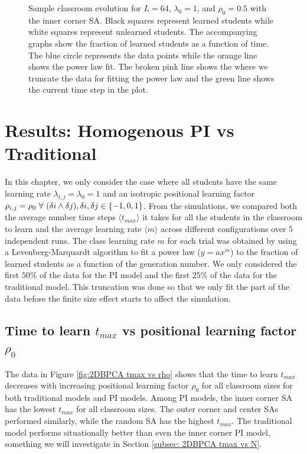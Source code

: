 \begin{figure}[htbp!]
    \caption{Sample classroom evolution for $L=64$, $\lambda_0 = 1$, and $\rho_0 = 0.5$ with the inner corner SA. 
    Black squares represent learned students while white squares represent unlearned students. 
    The accompanying graphs show the fraction of learned students as a function of time. 
    The blue circle represents the data points while the orange line shows the power law fit. 
    The broken pink line shows the where we truncate the data for fitting the power law and the green line shows the current time step in the plot.}
    \label{fig:Sample classroom evolution}
 \end{figure}

\section{Results: Homogenous PI vs Traditional}
In this chapter, we only consider the case where all students have the same learning rate $\lambda_{i,j} = \lambda_0 = 1$ and an isotropic positional learning factor $\rho_{i,j} = \rho_0 \space ~\forall~ (\delta i \land \delta j),  \delta i, \delta j \in \lbrace -1,0,1 \rbrace $. 
From the simulations, we compared both the average number time steps $\langle t_{max} \rangle$ it takes for all the students in the classroom to learn and the average learning rate $\langle m \rangle$ across different configurations over 5 independent runs.
 The class learning rate $m$ for each trial was obtained by using a Levenberg-Marquardt algorithm to fit a power law ($y = ax^m$) to the fraction of learned students as a function of the generation number. 
 We only considered the first $50\%$ of the data for the PI model and the first $25\%$ of the data for the traditional model. 
This truncation was done so that we only fit the part of the data before the finite size effect starts to affect the simulation.

\subsection{Time to learn $t_{max}$ vs positional learning factor $\rho_0$} \label{subsec: 2DBPCA tmax vs rho}

The data in Figure \ref{fig:2DBPCA tmax vs rho} shows that the time to learn $t_{max}$ decreases with increasing positional learning factor $\rho_0$ for all classroom sizes for both traditional models and PI models. 
Among PI models, the inner corner SA has the lowest $t_{max}$ for all classroom sizes. 
The outer corner and center SAs performed similarly, while the random SA has the highest $t_{max}$. 
The traditional model performs situationally better than even the inner corner PI model, something we will investigate in Section \ref{subsec: 2DBPCA tmax vs N}.

